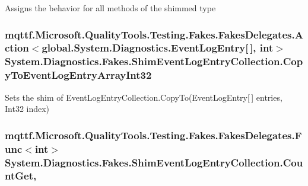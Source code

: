 Assigns the behavior for all methods of the shimmed type

\hypertarget{class_system_1_1_diagnostics_1_1_fakes_1_1_shim_event_log_entry_collection_a4bbedccf233f89668377f058f8d981d2}{
\subsubsection[{Copy\-To\-Event\-Log\-Entry\-Array\-Int32}]{\setlength{\rightskip}{0pt plus 5cm}mqttf.\-Microsoft.\-Quality\-Tools.\-Testing.\-Fakes.\-Fakes\-Delegates.\-Action$<$global.\-System.\-Diagnostics.\-Event\-Log\-Entry\mbox{[}$\,$\mbox{]}, int$>$ System.\-Diagnostics.\-Fakes.\-Shim\-Event\-Log\-Entry\-Collection.\-Copy\-To\-Event\-Log\-Entry\-Array\-Int32\hspace{0.3cm}{\ttfamily [set]}}}\label{class_system_1_1_diagnostics_1_1_fakes_1_1_shim_event_log_entry_collection_a4bbedccf233f89668377f058f8d981d2}


Sets the shim of Event\-Log\-Entry\-Collection.\-Copy\-To(\-Event\-Log\-Entry\mbox{[}$\,$\mbox{]} entries, Int32 index)

\hypertarget{class_system_1_1_diagnostics_1_1_fakes_1_1_shim_event_log_entry_collection_ac0d10484072ba5e51395a0e872e10580}{
\subsubsection[{Count\-Get}]{\setlength{\rightskip}{0pt plus 5cm}mqttf.\-Microsoft.\-Quality\-Tools.\-Testing.\-Fakes.\-Fakes\-Delegates.\-Func$<$int$>$ System.\-Diagnostics.\-Fakes.\-Shim\-Event\-Log\-Entry\-Collection.\-Count\-Get\hspace{0.3cm}{\ttfamily [get]}, {\ttfamily [set]}}}\label{class_system_1_1_diagnostics_1_1_fakes_1_1_shim_event_log_entry_collection_ac0d10484072ba5e51395a0e872e10580}


